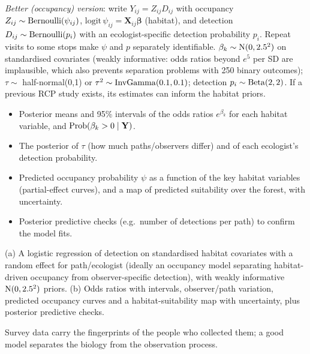 \documentclass[11pt]{article}
\begin{document}
\emph{Better (occupancy) version}: write $Y_{ij}=Z_{ij}D_{ij}$ with occupancy $Z_{ij}\sim\mathrm{Bernoulli}(\psi_{ij})$, $\mathrm{logit}\,\psi_{ij}=\mathbf X_{ij}\bm\beta$ (habitat), and detection $D_{ij}\sim\mathrm{Bernoulli}(p_i)$ with an ecologist-specific detection probability $p_i$. Repeat visits to some stops make $\psi$ and $p$ separately identifiable.
 $\beta_k\sim\mathrm{N}(0,2.5^2)$ on standardised covariates (weakly informative: odds ratios beyond $e^{5}$ per SD are implausible, which also prevents separation problems with 250 binary outcomes); $\tau\sim$ half-normal(0,1) or $\tau^2\sim\mathrm{InvGamma}(0.1,0.1)$; detection $p_i\sim\mathrm{Beta}(2,2)$. If a previous RCP study exists, its estimates can inform the habitat priors.

\begin{itemize}
\item Posterior means and 95\% intervals of the odds ratios $e^{\beta_k}$ for each habitat variable, and $\mathrm{Prob}(\beta_k>0\mid\mathbf Y)$.
\item The posterior of $\tau$ (how much paths/observers differ) and of each ecologist's detection probability.
\item Predicted occupancy probability $\psi$ as a function of the key habitat variables (partial-effect curves), and a map of predicted suitability over the forest, with uncertainty.
\item Posterior predictive checks (e.g.\ number of detections per path) to confirm the model fits.
\end{itemize}

\begin{answer}
(a) A logistic regression of detection on standardised habitat covariates with a random effect for path/ecologist (ideally an occupancy model separating habitat-driven occupancy from observer-specific detection), with weakly informative $\mathrm{N}(0,2.5^2)$ priors. (b) Odds ratios with intervals, observer/path variation, predicted occupancy curves and a habitat-suitability map with uncertainty, plus posterior predictive checks.
\end{answer}

\begin{takeaway}
Survey data carry the fingerprints of the people who collected them; a good model separates the biology from the observation process.
\end{takeaway}
\end{document}
